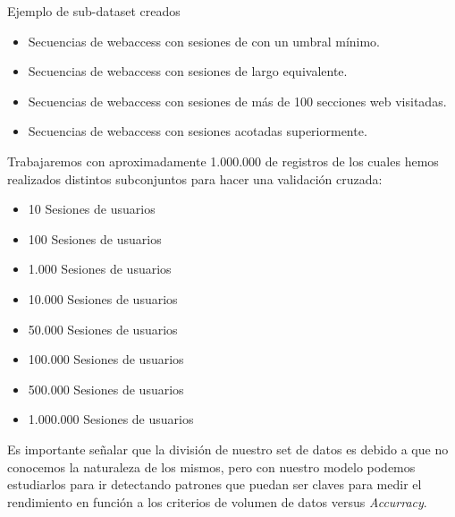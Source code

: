 Ejemplo de sub-dataset creados
\begin{itemize}
	\setlength{\itemsep}{0.9pt}
	\setlength{\parskip}{0pt}
	\setlength{\parsep}{0pt}
	\item Secuencias de webaccess con sesiones de con un umbral mínimo.
	\item Secuencias de webaccess con sesiones de largo equivalente.
	\item Secuencias de webaccess con sesiones de más de 100 secciones web visitadas.
	\item Secuencias de webaccess con sesiones acotadas superiormente.
\end{itemize}


Trabajaremos con aproximadamente 1.000.000 de registros de los cuales hemos realizados distintos subconjuntos para hacer una validación cruzada:

\begin{itemize}
	\setlength{\itemsep}{1pt}
	\setlength{\parskip}{0pt}
	\setlength{\parsep}{0pt}
	\item 10 Sesiones de usuarios
	\item 100 Sesiones de usuarios
	\item 1.000 Sesiones de usuarios
	\item 10.000 Sesiones de usuarios
	\item 50.000 Sesiones de usuarios
	\item 100.000 Sesiones de usuarios
	\item 500.000 Sesiones de usuarios
	\item 1.000.000 Sesiones de usuarios
\end{itemize}


Es importante señalar que la división de nuestro set de datos es debido a que no conocemos la naturaleza de los mismos, pero con nuestro modelo podemos estudiarlos para ir detectando patrones que puedan ser claves para medir el rendimiento en función a los criterios de volumen de datos versus \emph{Accurracy}.






